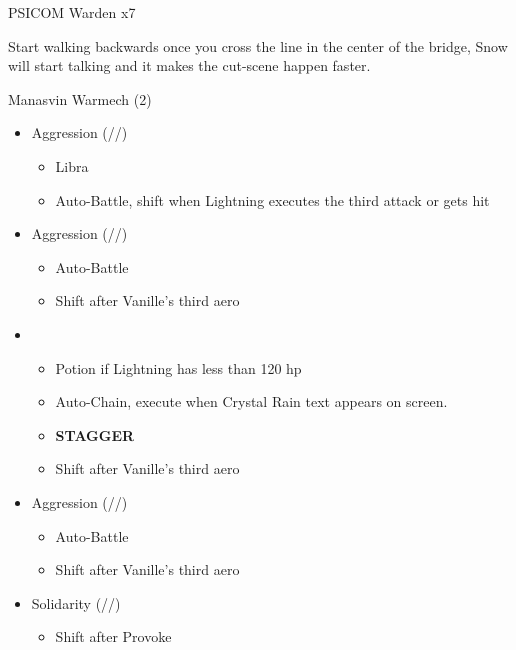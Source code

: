 	\renewcommand{\second}{[2] Solidarity (\com/\sen/\med)}

	\renewcommand{\third}{[3] Aggression (\com/\com/\rav)}

	\renewcommand{\fourth}{[4] Aggression (\com/\com/\rav)}

	\begin{battle}[0:01]{PSICOM Warden x7}
		 
	\end{battle}
	
	Start walking backwards once you cross the line in the center of the bridge, Snow will start talking and it makes the cut-scene happen faster.

	\begin{battle}[0:50]{Manasvin Warmech (2)}
		\begin{itemize}
			\item \third
			      \begin{itemize}
				      \item Libra
				      \item Auto-Battle, shift when Lightning executes the third attack or gets hit
			      \end{itemize}
			\item \fourth
			      \begin{itemize}
				      \item Auto-Battle
				      \item Shift after Vanille's third aero
			      \end{itemize}
			\item \first
			      \begin{itemize}
				      \item Potion if Lightning has less than 120 hp
				      \item Auto-Chain, execute when Crystal Rain text appears on screen.
				      \item \textbf{STAGGER}
				      \item Shift after Vanille's third aero
			      \end{itemize}
			\item \third
			      \begin{itemize}
				      \item Auto-Battle
				      \item Shift after Vanille's third aero
			      \end{itemize}
			\item \second
			      \begin{itemize}
				      \item Shift after Provoke

\end{itemize}
\end{itemize}
\end{battle}
